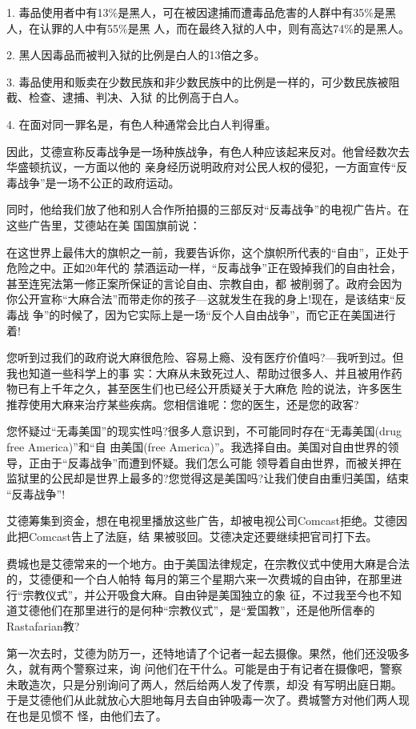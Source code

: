 ﻿\documentclass[11pt]{article}
\begin{document}
1. 毒品使用者中有13\%是黑人，可在被因逮捕而遭毒品危害的人群中有35\%是黑人，在认罪的人中有55\%是黑
人，而在最终入狱的人中，则有高达74\%的是黑人。

2. 黑人因毒品而被判入狱的比例是白人的13倍之多。

3. 毒品使用和贩卖在少数民族和非少数民族中的比例是一样的，可少数民族被阻截、检查、逮捕、判决、入狱
的比例高于白人。

4. 在面对同一罪名是，有色人种通常会比白人判得重。

因此，艾德宣称反毒战争是一场种族战争，有色人种应该起来反对。他曾经数次去华盛顿抗议，一方面以他的
亲身经历说明政府对公民人权的侵犯，一方面宣传``反毒战争''是一场不公正的政府运动。

同时，他给我们放了他和别人合作所拍摄的三部反对``反毒战争''的电视广告片。在这些广告里，艾德站在美
国国旗前说：

在这世界上最伟大的旗帜之一前，我要告诉你，这个旗帜所代表的``自由''，正处于危险之中。正如20年代的
禁酒运动一样，``反毒战争''正在毁掉我们的自由社会，甚至连宪法第一修正案所保证的言论自由、宗教自由，都
被削弱了。政府会因为你公开宣称``大麻合法''而带走你的孩子---这就发生在我的身上!现在，是该结束``反毒战
争''的时候了，因为它实际上是一场``反个人自由战争''，而它正在美国进行着!

您听到过我们的政府说大麻很危险、容易上瘾、没有医疗价值吗?---我听到过。但我也知道一些科学上的事
实：大麻从未致死过人、帮助过很多人、并且被用作药物已有上千年之久，甚至医生们也已经公开质疑关于大麻危
险的说法，许多医生推荐使用大麻来治疗某些疾病。您相信谁呢：您的医生，还是您的政客?

您怀疑过``无毒美国''的现实性吗?很多人意识到，不可能同时存在``无毒美国(drug free America)''和``自
由美国(free America)''。我选择自由。美国对自由世界的领导，正由于``反毒战争''而遭到怀疑。我们怎么可能
领导着自由世界，而被关押在监狱里的公民却是世界上最多的?您觉得这是美国吗?让我们使自由重归美国，结束
``反毒战争''!


艾德筹集到资金，想在电视里播放这些广告，却被电视公司Comcast拒绝。艾德因此把Comcast告上了法庭，结
果被驳回。艾德决定还要继续把官司打下去。

费城也是艾德常来的一个地方。由于美国法律规定，在宗教仪式中使用大麻是合法的，艾德便和一个白人帕特
每月的第三个星期六来一次费城的自由钟，在那里进行``宗教仪式''，并公开吸食大麻。自由钟是美国独立的象
征，不过我至今也不知道艾德他们在那里进行的是何种``宗教仪式''，是``爱国教''，还是他所信奉的
Rastafarian教?

第一次去时，艾德为防万一，还特地请了个记者一起去摄像。果然，他们还没吸多久，就有两个警察过来，询
问他们在干什么。可能是由于有记者在摄像吧，警察未敢造次，只是分别询问了两人，然后给两人发了传票，却没
有写明出庭日期。于是艾德他们从此就放心大胆地每月去自由钟吸毒一次了。费城警方对他们两人现在也是见惯不
怪，由他们去了。
\end{document}
